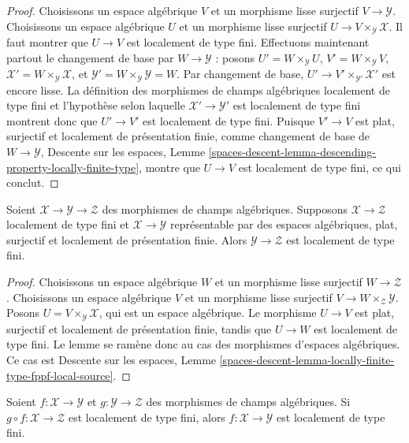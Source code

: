 \begin{proof}
Choisissons un espace algébrique $V$ et un morphisme lisse surjectif
$V \to \mathcal{Y}$. Choisissons un espace algébrique $U$ et un morphisme
lisse surjectif $U \to V \times_\mathcal{Y} \mathcal{X}$.
Il faut montrer que $U \to V$ est localement de type fini.
Effectuons maintenant partout le changement de base par
$W \to \mathcal{Y}$ : posons
$U' = W \times_\mathcal{Y} U$,
$V' = W \times_\mathcal{Y} V$,
$\mathcal{X}' = W \times_\mathcal{Y} \mathcal{X}$,
et $\mathcal{Y}' = W \times_\mathcal{Y} \mathcal{Y} = W$.
Par changement de base,
$U' \to V' \times_{\mathcal{Y}'} \mathcal{X}'$ est encore lisse.
La définition des morphismes de champs algébriques localement de type
fini et l'hypothèse selon laquelle
$\mathcal{X}' \to \mathcal{Y}'$ est localement de type fini montrent donc
que $U' \to V'$ est localement de type fini. Puisque $V' \to V$ est
plat, surjectif et localement de présentation finie, comme changement
de base de $W \to \mathcal{Y}$, Descente sur les espaces, Lemme
\ref{spaces-descent-lemma-descending-property-locally-finite-type},
montre que $U \to V$ est localement de type fini, ce qui conclut.
\end{proof}

\begin{lemma}
\label{lemma-check-finite-type-precompose}
Soient $\mathcal{X} \to \mathcal{Y} \to \mathcal{Z}$ des morphismes de
champs algébriques. Supposons $\mathcal{X} \to \mathcal{Z}$ localement
de type fini et $\mathcal{X} \to \mathcal{Y}$ représentable par des
espaces algébriques, plat, surjectif et localement de présentation finie.
Alors $\mathcal{Y} \to \mathcal{Z}$ est localement de type fini.
\end{lemma}

\begin{proof}
Choisissons un espace algébrique $W$ et un morphisme lisse surjectif
$W \to \mathcal{Z}$. Choisissons un espace algébrique $V$ et un morphisme
lisse surjectif $V \to W \times_\mathcal{Z} \mathcal{Y}$. Posons
$U = V \times_\mathcal{Y} \mathcal{X}$, qui est un espace algébrique.
Le morphisme $U \to V$ est plat, surjectif et localement de présentation
finie, tandis que $U \to W$ est localement de type fini.
Le lemme se ramène donc au cas des morphismes d'espaces algébriques.
Ce cas est Descente sur les espaces, Lemme
\ref{spaces-descent-lemma-locally-finite-type-fppf-local-source}.
\end{proof}

\begin{lemma}
\label{lemma-finite-type-permanence}
Soient $f : \mathcal{X} \to \mathcal{Y}$ et
$g : \mathcal{Y} \to \mathcal{Z}$ des morphismes de champs algébriques.
Si $g \circ f : \mathcal{X} \to \mathcal{Z}$ est localement de type fini,
alors $f : \mathcal{X} \to \mathcal{Y}$ est localement de type fini.
\end{lemma}

